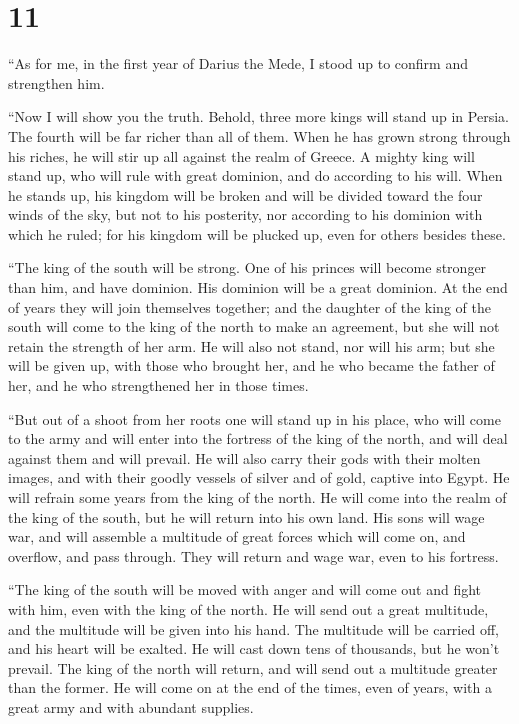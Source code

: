 \hypertarget{section-10}{%
\section{11}\label{section-10}}

 ``As for me, in the first year of Darius the Mede, I
stood up to confirm and strengthen him.

 ``Now I will show you the truth. Behold, three more kings
will stand up in Persia. The fourth will be far richer than all of them.
When he has grown strong through his riches, he will stir up all against
the realm of Greece.  A mighty king will stand up, who
will rule with great dominion, and do according to his will.
 When he stands up, his kingdom will be broken and will be
divided toward the four winds of the sky, but not to his posterity, nor
according to his dominion with which he ruled; for his kingdom will be
plucked up, even for others besides these.

 ``The king of the south will be strong. One of his
princes will become stronger than him, and have dominion. His dominion
will be a great dominion.  At the end of years they will
join themselves together; and the daughter of the king of the south will
come to the king of the north to make an agreement, but she will not
retain the strength of her arm. He will also not stand, nor will his
arm; but she will be given up, with those who brought her, and he who
became the father of her, and he who strengthened her in those times.

 ``But out of a shoot from her roots one will stand up in
his place, who will come to the army and will enter into the fortress of
the king of the north, and will deal against them and will prevail.
 He will also carry their gods with their molten images,
and with their goodly vessels of silver and of gold, captive into Egypt.
He will refrain some years from the king of the north.  He
will come into the realm of the king of the south, but he will return
into his own land.  His sons will wage war, and will
assemble a multitude of great forces which will come on, and overflow,
and pass through. They will return and wage war, even to his fortress.

 ``The king of the south will be moved with anger and
will come out and fight with him, even with the king of the north. He
will send out a great multitude, and the multitude will be given into
his hand.  The multitude will be carried off, and his
heart will be exalted. He will cast down tens of thousands, but he won't
prevail.  The king of the north will return, and will
send out a multitude greater than the former. He will come on at the end
of the times, even of years, with a great army and with abundant
supplies.

